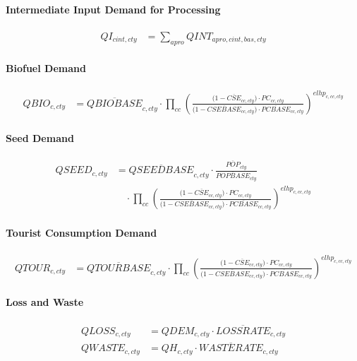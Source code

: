 \paragraph{Intermediate Input Demand for Processing}
\begin{align}
  QI_{cint,cty}
  &= \sum_{apro} QINT_{apro,cint,bas,cty}
  \tag{QINTEQ}\label{eq:QINTEQ}
\end{align}

\paragraph{Biofuel Demand}
\begin{align}
  QBIO_{c,cty}
  &= \overline{QBIOBASE}_{c,cty}
     \cdot
     \prod_{cc}\!
     \left(
       \frac{\bigl(1-\overline{CSE}_{cc,cty}\bigr)\cdot PC_{cc,cty}}
            {\bigl(1-\overline{CSEBASE}_{cc,cty}\bigr)\cdot \overline{PCBASE}_{cc,cty}}
     \right)^{elhp_{c,cc,cty}}
  \tag{QBIOEQ}\label{eq:QBIOEQ}
\end{align}

\paragraph{Seed Demand}
\begin{align}
  QSEED_{c,cty}
  &= \overline{QSEEDBASE}_{c,cty}
     \cdot
     \frac{\overline{POP}_{cty}}{\overline{POPBASE}_{cty}}
     \nonumber\\
  &\quad \cdot
     \prod_{cc}\!
     \left(
       \frac{\bigl(1-\overline{CSE}_{cc,cty}\bigr)\cdot PC_{cc,cty}}
            {\bigl(1-\overline{CSEBASE}_{cc,cty}\bigr)\cdot \overline{PCBASE}_{cc,cty}}
     \right)^{elhp_{c,cc,cty}}
  \tag{QSEEDEQ}\label{eq:QSEEDEQ}
\end{align}

\paragraph{Tourist Consumption Demand}
\begin{align}
  QTOUR_{c,cty}
  &= \overline{QTOURBASE}_{c,cty}
     \cdot
     \prod_{cc}\!
     \left(
       \frac{\bigl(1-\overline{CSE}_{cc,cty}\bigr)\cdot PC_{cc,cty}}
            {\bigl(1-\overline{CSEBASE}_{cc,cty}\bigr)\cdot \overline{PCBASE}_{cc,cty}}
     \right)^{elhp_{c,cc,cty}}
  \tag{QTOUREQ}\label{eq:QTOUREQ}
\end{align}

\paragraph{Loss and Waste}
\begin{align}
  QLOSS_{c,cty}
  &= QDEM_{c,cty} \cdot \overline{LOSSRATE}_{c,cty}
  \tag{QLOSSEQ}\label{eq:QLOSSEQ}\\[.3em]
  QWASTE_{c,cty}
  &= QH_{c,cty} \cdot \overline{WASTERATE}_{c,cty}
  \tag{QWASTEEQ}\label{eq:QWASTEEQ}
\end{align}

